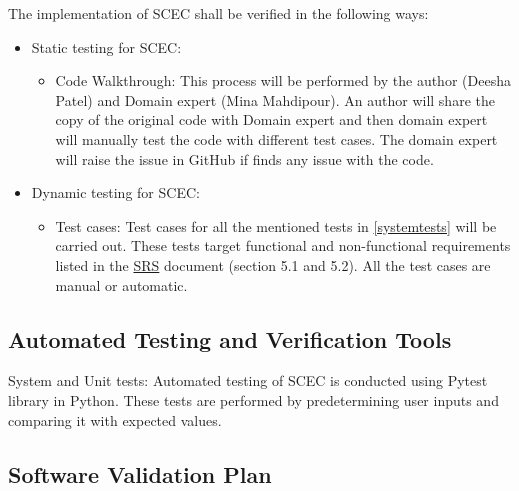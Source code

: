 \documentclass[12pt, titlepage]{article}
\begin{document}
The implementation of SCEC shall be verified in the following ways:

\begin{itemize}

\item Static testing for SCEC:

\begin{itemize}


\item Code Walkthrough: This process will be performed by the author (Deesha Patel) and Domain expert (Mina Mahdipour). An author will share the copy of the original code with Domain expert and then domain expert will manually test the code with different test cases. The domain expert will raise the issue in GitHub if finds any issue with the code.

\end{itemize}
\end{itemize}

\begin{itemize}

\item Dynamic testing for SCEC:

\begin{itemize}


\item Test cases: Test cases for all the mentioned tests in \autoref{systemtests} will be carried out. These tests target functional and non-functional requirements listed in the \href{https://github.com/DeeshaPatel/CAS-741-Solar-Cooker/blob/7c53c8d9a19ca2f94dfba6ba9208eae0bf03b8cc/docs/SRS/SRS.pdf}{SRS} document (section 5.1 and 5.2). All the test cases are manual or automatic.  

\end{itemize}
\end{itemize}



\subsection{Automated Testing and Verification Tools}

System and Unit tests: Automated testing of SCEC is conducted using Pytest library in Python. These tests are performed by predetermining user inputs and comparing it with expected values. 

\subsection{Software Validation Plan}
\end{document}
